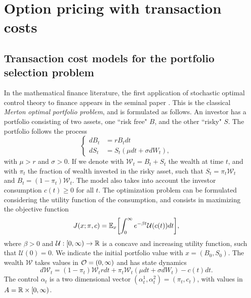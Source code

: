 

\chapter{Option pricing with transaction costs}\label{Chapter5}
\minitoc%

\vspace{5em}

\section{Transaction cost models for the portfolio selection problem}
In the mathematical finance literature, the first application of stochastic optimal control theory to finance appears in the seminal paper \cite{Me71}.
This is the classical \emph{Merton optimal portfolio problem}, and is formulated as follows. An investor has a portfolio consisting of two assets, one ``risk free" $B$,
and the other ``risky" $S$. The portfolio follows the process
\begin{equation}\label{Merton_problem1}
 \begin{cases}
 dB_t &=  rB_t dt \\
 dS_t &=  S_t \left( \mu dt + \sigma dW_t \right),
\end{cases}
\end{equation} 
with $\mu>r$ and $\sigma>0$. If we denote with $\mathcal{W}_t = B_t + S_t$  the wealth at time $t$, and with $\pi_t$ the fraction of wealth invested in the risky asset, such that
$S_t = \pi_t \mathcal{W}_t$ and $B_t = (1-\pi_t) \mathcal{W}_t$. The model also takes into account the investor consumption $c(t) \geq 0$ for all $t$. 
The optimization problem can be formulated considering the utility function of the consumption, and consists in maximizing the objective function
\begin{equation}
 J(x;\pi,c) = \mathbb{E}_x \biggl[ \int_0^{\infty} e^{-\beta t} \mathcal{U}(c(t)) dt \biggr],
\end{equation}
where $\beta > 0$ and $\mathcal{U}: [0,\infty) \to \mathbb{R}$ is a concave and increasing utility function, such that $\mathcal{U}(0)=0$.
We indicate the initial portfolio value with $x = (B_0,S_0)$. 
The wealth $\mathcal{W}$ takes values in $\mathcal{O} = (0,\infty)$ and has state dynamics
\begin{equation}
 d \mathcal{W}_t = (1-\pi_t) \mathcal{W}_t r dt + \pi_t \mathcal{W}_t (\mu dt + \sigma dW_t) - c(t)dt.
\end{equation}
The control $\alpha_t$ is a two dimensional vector $(\alpha^1_t,\alpha^2_t) = (\pi_t,c_t)$, with values in $A = \mathbb{R} \times [0,\infty)$. 
